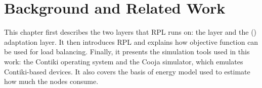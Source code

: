\chapter{Background and Related Work}\label{C:Background}

This chapter first describes the two layers that RPL runs on: the
\ieeemac{} layer and the \lowpanF{}
(\lowpan{}) adaptation layer. It then introduces RPL and
explains how objective function can be used for load balancing.
Finally, it presents the simulation tools used in this work: the Contiki
operating system and the Cooja simulator, which emulates Contiki-based devices.
It also covers the basis of energy model used to estimate how much
the nodes consume.






